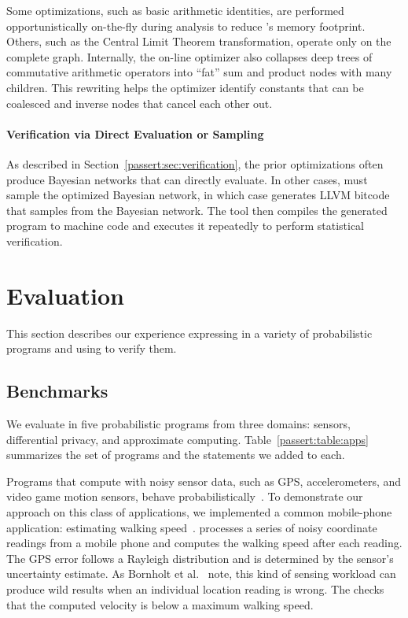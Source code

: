 Some optimizations, such as basic arithmetic identities, are performed
opportunistically on-the-fly during analysis to reduce \tool's memory
footprint.
Others, such as the Central Limit Theorem transformation, operate only on the
complete graph.
Internally, the on-line optimizer also collapses deep trees of commutative
arithmetic operators into ``fat'' sum and product nodes with many children.
This rewriting helps the optimizer identify constants that can be coalesced and
inverse nodes that cancel each other out.



\paragraph{Verification via Direct Evaluation or Sampling}
As described in Section~\ref{passert:sec:verification}, the prior
optimizations often produce Bayesian networks that \tool can
directly evaluate.  In other cases, \tool must sample the
optimized Bayesian network, in which case \tool generates LLVM bitcode
that samples from the Bayesian network.
The tool then compiles the generated program to machine code and executes
it repeatedly to perform statistical verification.



\section{Evaluation}
\label{passert:sec:evaluation}


This section describes our experience expressing \passerts in a variety of
probabilistic programs and using \tool to verify them.

\subsection{Benchmarks}

We evaluate \passerts in five probabilistic programs
from three domains: sensors, differential privacy, and approximate
computing. 
Table~\ref{passert:table:apps} summarizes the set of programs and the \passert
statements we added to each.

Programs that compute with noisy sensor data, such as GPS,
accelerometers, and video game motion sensors, behave
probabilistically~\cite{PPT:05,uncertaint}. To demonstrate our
approach on this class of applications, we implemented a common
mobile-phone application: estimating walking speed~\cite{uncertaint}.
 processes a series of noisy coordinate readings from a mobile
phone and computes the walking speed after each reading.
The GPS error follows a Rayleigh distribution and is determined by the sensor's
uncertainty estimate.
As Bornholt et al.~\cite{uncertaint} note, this kind of sensing workload can
produce wild results when an individual location reading is wrong.
The \passert checks that the computed velocity is below a maximum walking
speed.

